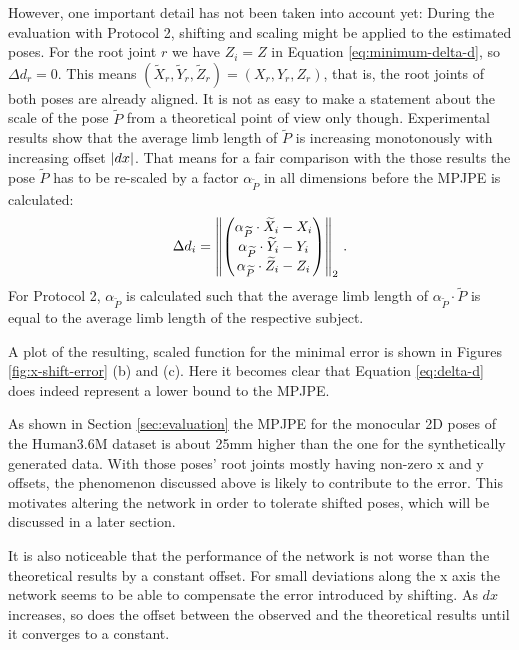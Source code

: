 However, one important detail has not been taken into account yet:
During the evaluation with Protocol 2, shifting and scaling might be applied to the estimated poses. 
For the root joint $r$ we have $Z_i = Z$ in Equation \eqref{eq:minimum-delta-d}, so $\Delta d_r = 0$. 
This means $(\widetilde{X}_r, \widetilde{Y}_r, \widetilde{Z}_r) = (X_r, Y_r, Z_r)$, that is, the root joints of both poses are already aligned.
It is not as easy to make a statement about the scale of the pose $\widetilde{P}$ from a theoretical point of view only though.
Experimental results show that the average limb length of $\widetilde{P}$ is increasing monotonously with increasing offset $\abs{dx}$.
That means for a fair comparison with the those results the pose $\widetilde{P}$ has to be re-scaled by a factor $\alpha_{\widetilde{P}}$ in all dimensions before the MPJPE is calculated:
\begin{equation}
	\Delta d_i = \norm{ 
	\begin{pmatrix}
		\alpha_{\widetilde{P}} \cdot \widetilde{X}_i - X_i \\
		\alpha_{\widetilde{P}} \cdot \widetilde{Y}_i - Y_i \\
		\alpha_{\widetilde{P}} \cdot \widetilde{Z}_i - Z_i
	\end{pmatrix}
	}_2 \ .
\end{equation}
For Protocol 2, $\alpha_{\widetilde{P}}$ is calculated such that the average limb length of $\alpha_{\widetilde{P}} \cdot \widetilde{P}$ is equal to the average limb length of the respective subject.


 
A plot of the resulting, scaled function for the minimal error is shown in Figures \ref{fig:x-shift-error} (b) and (c).
Here it becomes clear that Equation \eqref{eq:delta-d} does indeed represent a lower bound to the MPJPE.

As shown in Section \ref{sec:evaluation} the MPJPE for the monocular 2D poses of the Human3.6M dataset is about 25mm higher than the one for the synthetically generated data.
With those poses' root joints mostly having non-zero x and y offsets, the phenomenon discussed above is likely to contribute to the error.
This motivates altering the network in order to tolerate shifted poses, which will be discussed in a later section.

It is also noticeable that the performance of the network is not worse than the theoretical results by a constant offset.
For small deviations along the x axis the network seems to be able to compensate the error introduced by shifting.
As $dx$ increases, so does the offset between the observed and the theoretical results until it converges to a constant.

